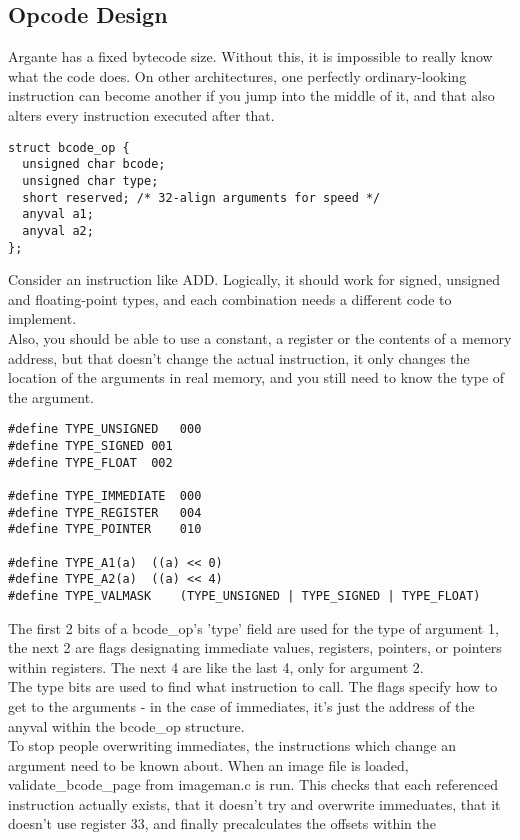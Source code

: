 \documentclass[a4paper,oneside,openany]{book}
\begin{document}
\subsection{Opcode Design}
Argante has a fixed bytecode size. Without this, it is impossible to really know what
the code does. On other architectures, one perfectly ordinary-looking instruction can
become another if you jump into the middle of it, and that also alters every
instruction executed after that.
\begin{verbatim}
struct bcode_op {
  unsigned char bcode;
  unsigned char type;
  short reserved; /* 32-align arguments for speed */
  anyval a1;
  anyval a2;
};
\end{verbatim}
Consider an instruction like ADD. Logically, it should work for signed, unsigned
and floating-point types, and each combination needs a different code to implement.\smallskip\\
Also, you should be able to use a constant, a register or the contents of a memory
address, but that doesn't change the actual instruction, it only changes the location
of the arguments in real memory, and you still need to know the type of the argument.
\begin{verbatim}
#define TYPE_UNSIGNED	000
#define TYPE_SIGNED	001
#define TYPE_FLOAT	002

#define TYPE_IMMEDIATE	000
#define TYPE_REGISTER	004
#define TYPE_POINTER	010

#define TYPE_A1(a)	((a) << 0)
#define TYPE_A2(a)	((a) << 4)
#define TYPE_VALMASK	(TYPE_UNSIGNED | TYPE_SIGNED | TYPE_FLOAT)
\end{verbatim}
The first 2 bits of a bcode\_op's 'type' field are used for the type of argument 1,
the next 2 are flags designating immediate values, registers, pointers, or pointers
within registers. The next 4 are like the last 4, only for argument 2.\smallskip\\
The type bits are used to find what instruction to call. The flags specify how to
get to the arguments - in the case of immediates, it's just the address of the anyval
within the bcode\_op structure.\smallskip\\
To stop people overwriting immediates, the instructions which change an argument
need to be known about. When an image file is loaded, \\
validate\_bcode\_page from imageman.c is run. This checks that each referenced
instruction actually exists, that it doesn't try and overwrite immeduates, that
it doesn't use register 33, and finally precalculates the offsets within the 
\end{document}
